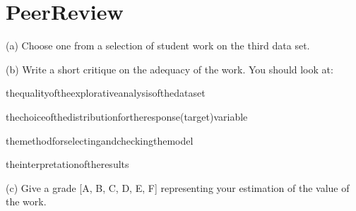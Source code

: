 \section{PeerReview}

(a) Choose one from a selection of student work on the third data set.

(b) Write a short critique on the adequacy of the work. You should look at:

\begin{itemization}
\item thequalityoftheexplorativeanalysisofthedataset
\item thechoiceofthedistributionfortheresponse(target)variable 
\item  themethodforselectingandcheckingthemodel
\item  theinterpretationoftheresults
\end{itemization}

(c) Give a grade [A, B, C, D, E, F] representing your estimation of the value of the work.

